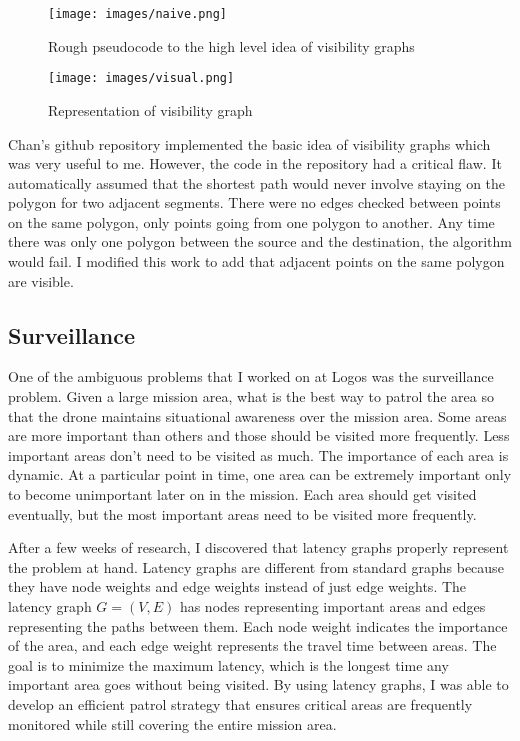 \documentclass[12pt]{article}
\begin{document}
\begin{figure}[h]
    \centering
    \texttt{[image: images/naive.png]}
    \caption{Rough pseudocode to the high level idea of visibility graphs}
    \label{fig:code}
\end{figure}



\begin{figure}[h]
    \centering
    \texttt{[image: images/visual.png]}
    \caption{Representation of visibility graph}
    \label{fig:visual}
\end{figure}

Chan's github repository implemented the basic idea of visibility graphs which was very useful to me. \cite{chanMatthewachanVgraph2022} However, the code in the repository had a critical flaw. It automatically assumed that the shortest path would never involve staying on the polygon for two adjacent segments. There were no edges checked between points on the same polygon, only points going from one polygon to another. Any time there was only one polygon between the source and the destination, the algorithm would fail. I modified this work to add that adjacent points on the same polygon are visible.

\subsection{Surveillance}
One of the ambiguous problems that I worked on at Logos was the surveillance problem. Given a large mission area, what is the best way to patrol the area so that the drone maintains situational awareness over the mission area. Some areas are more important than others and those should be visited more frequently. Less important areas don't need to be visited as much. The importance of each area is dynamic. At a particular point in time, one area can be extremely important only to become unimportant later on in the mission. Each area should get visited eventually, but the most important areas need to be visited more frequently.

After a few weeks of research, I discovered that latency graphs properly represent the problem at hand. Latency graphs are different from standard graphs because they have node weights and edge weights instead of just edge weights. The latency graph $G = (V,E)$ has nodes representing important areas and edges representing the paths between them. Each node weight indicates the importance of the area, and each edge weight represents the travel time between areas. The goal is to minimize the maximum latency, which is the longest time any important area goes without being visited. By using latency graphs, I was able to develop an efficient patrol strategy that ensures critical areas are frequently monitored while still covering the entire mission area.
\end{document}
